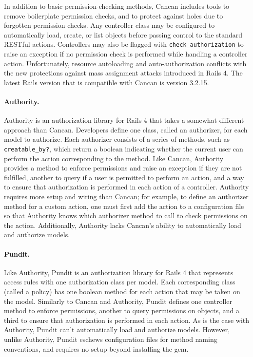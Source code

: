 In addition to basic permission-checking methods, Cancan includes tools to remove boilerplate permission checks, and to protect against holes due to forgotten permission checks. Any controller class may be configured to automatically load, create, or list objects before passing control to the standard RESTful actions. Controllers may also be flagged with \verb!check_authorization! to raise an exception if no permission check is performed while handling a controller action. Unfortunately, resource autoloading and auto-authorization conflicts with the new protections against mass assignment attacks introduced in Rails 4. The latest Rails version that is compatible with Cancan is version 3.2.15.

\paragraph{Authority.} Authority is an authorization library for Rails 4 that takes a somewhat different approach than Cancan. Developers define one class, called an authorizer, for each model to authorize. Each authorizer consists of a series of methods, such as \verb!creatable_by?!, which return a boolean indicating whether the current user can perform the action corresponding to the method. Like Cancan, Authority provides a method to enforce permissions and raise an exception if they are not fulfilled, another to query if a user is permitted to perform an action, and a way to ensure that authorization is performed in each action of a controller. Authority requires more setup and wiring than Cancan; for example, to define an authorizer method for a custom action, one must first add the action to a configuration file so that Authority knows which authorizer method to call to check permissions on the action. Additionally, Authority lacks Cancan’s ability to automatically load and authorize models.

\paragraph{Pundit.} Like Authority, Pundit is an authorization library for Rails 4 that represents access rules with one authorization class per model. Each corresponding class (called a policy) has one boolean method for each action that may be taken on the model. Similarly to Cancan and Authority, Pundit defines one controller method to enforce permissions, another to query permissions on objects, and a third to ensure that authorization is performed in each action. As is the case with Authority, Pundit can’t automatically load and authorize models. However, unlike Authority, Pundit eschews configuration files for method naming conventions, and requires no setup beyond installing the gem.

